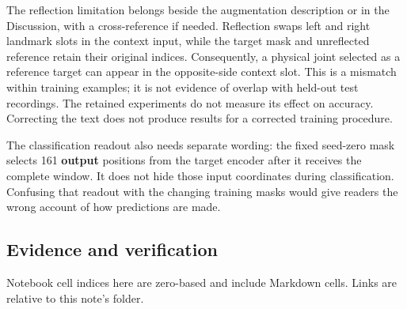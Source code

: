 \documentclass[
  11pt,
]{article}
\begin{document}
The reflection limitation belongs beside the augmentation description or
in the Discussion, with a cross-reference if needed. Reflection swaps
left and right landmark slots in the context input, while the target
mask and unreflected reference retain their original indices.
Consequently, a physical joint selected as a reference target can appear
in the opposite-side context slot. This is a mismatch within training
examples; it is not evidence of overlap with held-out test recordings.
The retained experiments do not measure its effect on accuracy.
Correcting the text does not produce results for a corrected training
procedure.

The classification readout also needs separate wording: the fixed
seed-zero mask selects 161 \textbf{output} positions from the target
encoder after it receives the complete window. It does not hide those
input coordinates during classification. Confusing that readout with the
changing training masks would give readers the wrong account of how
predictions are made.

\clearpage
\subsection{Evidence and verification}\label{evidence-and-verification}

Notebook cell indices here are zero-based and include Markdown cells.
Links are relative to this note's folder.
\end{document}
